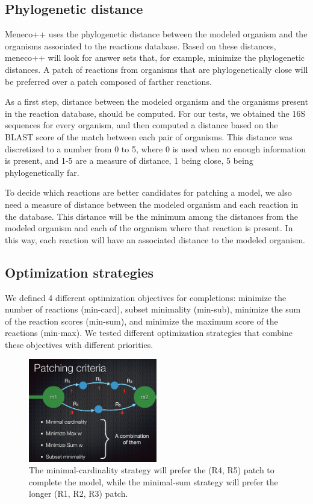 \documentclass{article}
\begin{document}
\subsection{Phylogenetic distance}

Meneco++ uses the phylogenetic distance between the modeled organism and the organisms associated to the reactions database. Based on these distances, meneco++ will look for answer sets that, for example, minimize the phylogenetic distances. A patch of reactions from organisms that are phylogenetically close will be preferred over a patch composed of farther reactions.

As a first step, distance between the modeled organism and the organisms present in the reaction database, should be computed. For our tests, we obtained the 16S sequences for every organism, and then computed a distance based on the BLAST score of the match between each pair of organisms. This distance was discretized to a number from 0 to 5, where 0 is used when no enough information is present, and 1-5 are a measure of distance, 1 being close, 5 being phylogenetically far.

To decide which reactions are better candidates for patching a model, we also need a measure of distance between the modeled organism and each reaction in the database. This distance will be the minimum among the distances from the modeled organism and each of the organism where that reaction is present. In this way, each reaction will have an associated distance to the modeled organism.

\subsection{Optimization strategies}

We defined 4 different optimization objectives for completions: 
minimize the number of reactions (min-card),
subset minimality (min-sub), 
minimize the sum of the reaction scores (min-sum), and  
minimize the maximum score of the reactions (min-max).
We tested different optimization strategies that combine these objectives with different priorities.

\begin{figure}[tb]
	\begin{center}
		\includegraphics[width=0.5\textwidth]{patchingStrategies.png}
	\end{center}
	\caption{The minimal-cardinality strategy will prefer the (R4, R5) patch to complete the model, while the minimal-sum strategy will prefer the longer (R1, R2, R3) patch.}
	\label{fig:figure1}
\end{figure}
\end{document}
